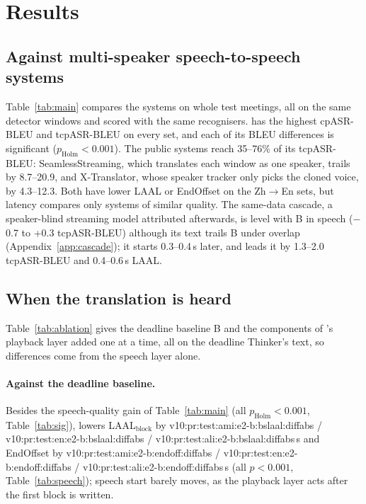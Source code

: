 \section{Results}
\label{sec:results}

\subsection{Against multi-speaker speech-to-speech systems}
\label{sec:res-sys}
\label{sec:res-offline}
\label{sec:res-overlap}



Table~\ref{tab:main} compares the systems on whole test meetings, all on the same detector windows and scored with the
same recognisers. \sys{} has the highest cpASR-BLEU and tcpASR-BLEU on every set, and each of its BLEU differences is
significant ($p_\text{Holm}<0.001$). The public systems reach 35--76\% of its tcpASR-BLEU: SeamlessStreaming, which
translates each window as one speaker, trails by 8.7--20.9, and X-Translator, whose speaker tracker only picks the
cloned voice, by 4.3--12.3. Both have lower LAAL or EndOffset on the Zh$\rightarrow$En sets, but latency compares only
systems of similar quality. The same-data cascade, a speaker-blind streaming model attributed afterwards, is level with
B in speech ($-$0.7 to +0.3 tcpASR-BLEU) although its text trails B under overlap (Appendix~\ref{app:cascade}); it
starts 0.3--0.4\,s later, and \sys{} leads it by 1.3--2.0 tcpASR-BLEU and 0.4--0.6\,s LAAL.

\subsection{When the translation is heard}
\label{sec:res-pa}
\label{sec:res-v10}

Table~\ref{tab:ablation} gives the deadline baseline B and the components of \sys{}'s playback layer added one at a
time, all on the deadline Thinker's text, so differences come from the speech layer alone.

\paragraph{Against the deadline baseline.} Besides the speech-quality gain of Table~\ref{tab:main} (all
$p_\text{Holm}<0.001$, Table~\ref{tab:sig}), \sys{} lowers LAAL$_\text{block}$ by
\num{v10:pr:test:ami:e2-b:bslaal:diffabs} / \num{v10:pr:test:en:e2-b:bslaal:diffabs} /
\num{v10:pr:test:ali:e2-b:bslaal:diffabs}\,s and EndOffset by \num{v10:pr:test:ami:e2-b:endoff:diffabs} /
\num{v10:pr:test:en:e2-b:endoff:diffabs} / \num{v10:pr:test:ali:e2-b:endoff:diffabs}\,s (all $p<0.001$,
Table~\ref{tab:speech}); speech start barely moves, as the playback layer acts after the first block is written.

